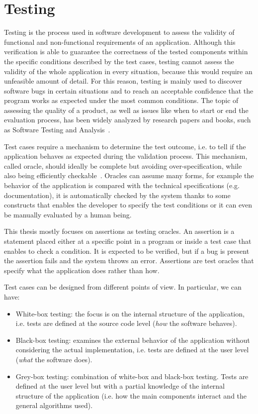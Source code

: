 \documentclass[11pt,a4paper,notitlepage]{article}
\begin{document}
\section{Testing}
Testing is the process used in software development to assess the validity of functional and non-functional requirements of an application. Although this verification is able to guarantee the correctness of the tested components within the specific conditions described by the test cases, testing cannot assess the validity of the whole application in every situation, because this would require an unfeasible amount of detail. For this reason, testing is mainly used to discover software bugs in certain situations and to reach an acceptable confidence that the program works as expected under the most common conditions. The topic of assessing the quality of a product, as well as issues like when to start or end the evaluation process, has been widely analyzed by research papers and books, such as Software Testing and Analysis~\cite{Young:2005:STA:1076948}.

Test cases require a mechanism to determine the test outcome, i.e. to tell if the application behaves as expected during the validation process. This mechanism, called oracle, should ideally be complete but avoiding over-specification, while also being efficiently checkable~\cite{Baresi:Oracles}. Oracles can assume many forms, for example the behavior of the application is compared with the technical specifications (e.g. documentation), it is automatically checked by the system thanks to some constructs that enables the developer to specify the test conditions or it can even be manually evaluated by a human being.

This thesis mostly focuses on assertions as testing oracles. An assertion is a statement placed either at a specific point in a program or inside a test case that enables to check a condition. It is expected to be verified, but if a bug is present the assertion fails and the system throws an error. Assertions are test oracles that specify what the application does rather than how.

Test cases can be designed from different points of view. In particular, we can have:
\begin{itemize}
	\item White-box testing: the focus is on the internal structure of the application, i.e. tests are defined at the source code level (\textit{how} the software behaves).
	\item Black-box testing: examines the external behavior of the application without considering the actual implementation, i.e. tests are defined at the user level (\textit{what} the software does).
	\item Grey-box testing: combination of white-box and black-box testing. Tests are defined at the user level but with a partial knowledge of the internal structure of the application (i.e. how the main components interact and the general algorithms used).
\end{itemize}
\end{document}
